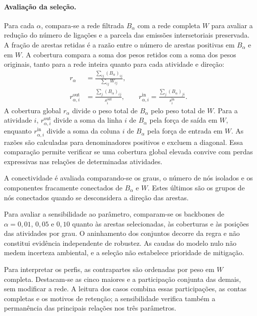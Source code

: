 \paragraph{Avaliação da seleção.}
Para cada $\alpha$, compara-se a rede filtrada $B_\alpha$ com a rede completa $W$ para avaliar a redução do número de ligações e a parcela das emissões intersetoriais preservada. A fração de arestas retidas é a razão entre o número de arestas positivas em $B_\alpha$ e em $W$. A cobertura compara a soma dos pesos retidos com a soma dos pesos originais, tanto para a rede inteira quanto para cada atividade e direção:
\begin{equation}
\begin{aligned}
r_\alpha&=\frac{\sum_{ij}(B_\alpha)_{ij}}{\sum_{ij}W_{ij}},\\
r_{\alpha,i}^{\mathrm{out}}&=\frac{\sum_j(B_\alpha)_{ij}}{s_i^{\mathrm{out}}},\qquad
r_{\alpha,i}^{\mathrm{in}}=\frac{\sum_j(B_\alpha)_{ji}}{s_i^{\mathrm{in}}}.
\end{aligned}
\label{eq:cobertura-backbone}
\end{equation}
A cobertura global $r_\alpha$ divide o peso total de $B_\alpha$ pelo peso total de $W$. Para a atividade $i$, $r_{\alpha,i}^{\mathrm{out}}$ divide a soma da linha $i$ de $B_\alpha$ pela força de saída em $W$, enquanto $r_{\alpha,i}^{\mathrm{in}}$ divide a soma da coluna $i$ de $B_\alpha$ pela força de entrada em $W$. As razões são calculadas para denominadores positivos e excluem a diagonal. Essa comparação permite verificar se uma cobertura global elevada convive com perdas expressivas nas relações de determinadas atividades.

A conectividade é avaliada comparando-se os graus, o número de nós isolados e os componentes fracamente conectados de $B_\alpha$ e $W$. Estes últimos são os grupos de nós conectados quando se desconsidera a direção das arestas.

Para avaliar a sensibilidade ao parâmetro, comparam-se os backbones de $\alpha=0{,}01$, $0{,}05$ e $0{,}10$ quanto às arestas selecionadas, às coberturas e às posições das atividades por grau. O aninhamento dos conjuntos decorre da regra e não constitui evidência independente de robustez. As caudas do modelo nulo não medem incerteza ambiental, e a seleção não estabelece prioridade de mitigação.

Para interpretar os perfis, as contrapartes são ordenadas por peso em $W$ completa. Destacam-se as cinco maiores e a participação conjunta das demais, sem modificar a rede. A leitura dos casos combina essas participações, as contas completas e os motivos de retenção; a sensibilidade verifica também a permanência das principais relações nos três parâmetros.
